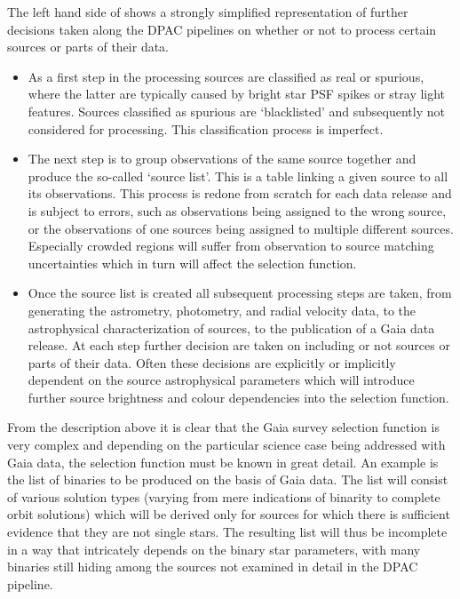 The left hand side of  shows a strongly simplified representation of further decisions taken along the DPAC pipelines on whether or not to process certain sources or parts of their data.
\begin{itemize}
    \item As a first step in the processing sources are classified as real or spurious, where the latter are typically caused by bright star PSF spikes or stray light features. Sources classified as spurious are `blacklisted' and subsequently not considered for processing. This classification process is imperfect.
    \item The next step is to group observations of the same source together and produce the so-called `source list'. This is a table linking a given source to all its observations. This process is redone from scratch for each data release and is subject to errors, such as observations being assigned to the wrong source, or the observations of one sources being assigned to multiple different sources. Especially crowded regions will suffer from observation to source matching uncertainties which in turn will affect the selection function.
    \item Once the source list is created all subsequent processing steps are taken, from generating the astrometry, photometry, and radial velocity data, to the astrophysical characterization of sources, to the publication of a Gaia data release. At each step further decision are taken on including or not sources or parts of their data. Often these decisions are explicitly or implicitly dependent on the source astrophysical parameters which will introduce further source brightness and colour dependencies into the selection function.
\end{itemize}

From the description above it is clear that the Gaia survey selection function is very complex and depending on the particular science case being addressed with Gaia data, the selection function must be known in great detail. An example is the list of binaries to be produced on the basis of Gaia data. The list will consist of various solution types (varying from mere indications of binarity to complete orbit solutions) which will be derived only for sources for which there is sufficient evidence that they are not single stars. The resulting list will thus be incomplete in a way that intricately depends on the binary star parameters, with many binaries still hiding among the sources not examined in detail in the DPAC pipeline.

